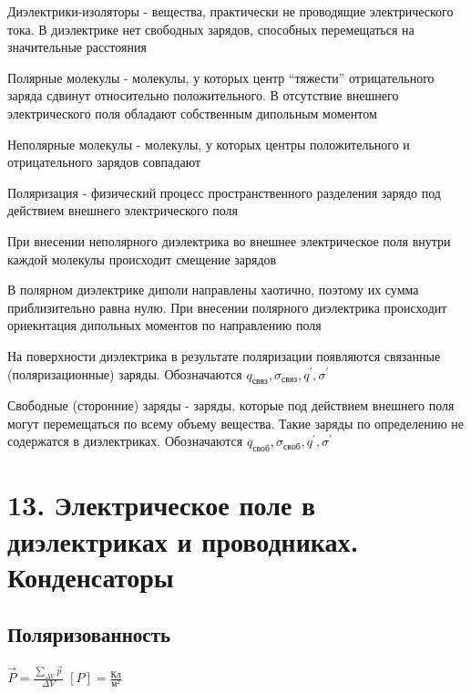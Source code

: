 \documentclass[12pt]{article}
\begin{document}
\Def Диэлектрики-изоляторы - вещества, практически не проводящие электрического тока. В диэлектрике нет 
свободных зарядов, способных перемещаться на значительные расстояния

\Def Полярные молекулы - молекулы, у которых центр \enquote{тяжести} отрицательного заряда сдвинут относительно положительного. 
В отсутствие внешнего электрического поля обладают собственным дипольным моментом

\Def Неполярные молекулы - молекулы, у которых центры положительного и отрицательного зарядов совпадают

\Def Поляризация - физический процесс пространственного разделения зарядо под действием внешнего электрического поля

При внесении неполярного диэлектрика во внешнее электрическое поля внутри каждой молекулы происходит смещение зарядов

В полярном диэлектрике диполи направлены хаотично, поэтому их сумма приблизительно равна нулю. 
При внесении полярного диэлектрика происходит ориекнтация дипольных моментов по направлению поля

На поверхности диэлектрика в результате поляризации появляются связанные (поляризационные) заряды. Обозначаются 
$q_\text{связ}, \sigma_\text{связ}, q^\prime, \sigma^\prime$

Свободные (сторонние) заряды - заряды, которые под действием внешнего поля могут перемещаться по всему объему 
вещества. Такие заряды по определению не содержатся в диэлектриках. 
Обозначаются $q_\text{своб}, \sigma_\text{своб}, q^\prime, \sigma^\prime$







\section{13. Электрическое поле в диэлектриках и проводниках. Конденсаторы}

\subsection{Поляризованность}

$\vec{P} = \frac{\sum_{\Delta V} \vec{p}}{\Delta V}$ \hfill $[P] = \frac{\text{Кл}}{\text{м}^2}$
\end{document}
